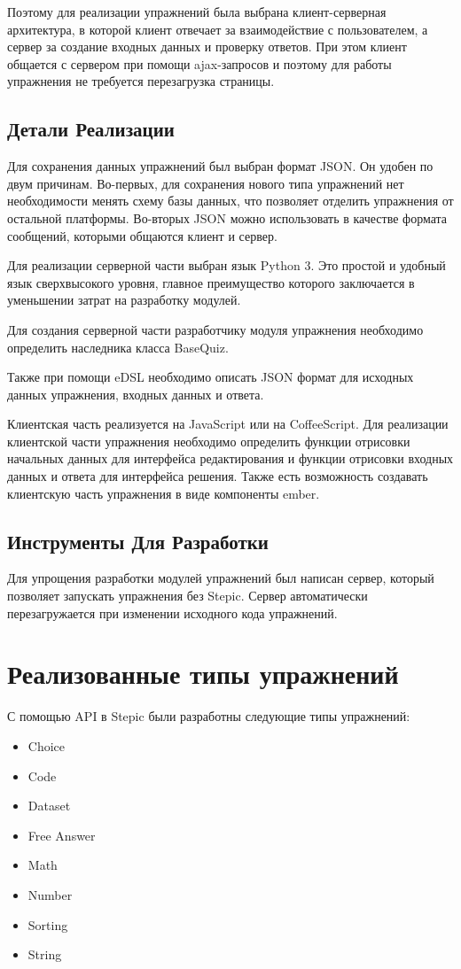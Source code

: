 \documentclass{matmex-diploma-custom}
\begin{document}
Поэтому для реализации упражнений была выбрана клиент-серверная
архитектура, в которой клиент отвечает за взаимодействие с
пользователем, а сервер за создание входных данных и проверку
ответов. При этом клиент общается с сервером при помощи ajax-запросов
и поэтому для работы упражнения не требуется перезагрузка страницы.

\subsection{Детали Реализации}
Для сохранения данных упражнений был выбран формат JSON. Он удобен по
двум причинам. Во-первых, для сохранения нового типа упражнений нет
необходимости менять схему базы данных, что позволяет отделить
упражнения от остальной платформы. Во-вторых JSON можно использовать в
качестве формата сообщений, которыми общаются клиент и сервер.

Для реализации серверной части выбран язык Python 3. Это простой и
удобный язык сверхвысокого уровня, главное преимущество которого
заключается в уменьшении затрат на разработку модулей.

Для создания серверной части разработчику модуля упражнения необходимо
определить наследника класса BaseQuiz.

Также при помощи eDSL необходимо описать JSON формат для исходных
данных упражнения, входных данных и ответа.

Клиентская часть реализуется на JavaScript или на CoffeeScript. Для
реализации клиентской части упражнения необходимо определить функции
отрисовки начальных данных для интерфейса редактирования и функции
отрисовки входных данных и ответа для интерфейса решения. Также есть
возможность создавать клиентскую часть упражнения в виде компоненты ember.

\subsection{Инструменты Для Разработки}
Для упрощения разработки модулей упражнений был написан сервер,
который позволяет запускать упражнения без Stepic. Сервер
автоматически перезагружается при изменении исходного кода упражнений.

\section{Реализованные типы упражнений}

С помощью API в Stepic были разработны следующие типы упражнений:
\begin{itemize}
\item Choice
\item Code
\item Dataset
\item Free Answer
\item Math
\item Number
\item Sorting
\item String
\end{itemize}
\end{document}
